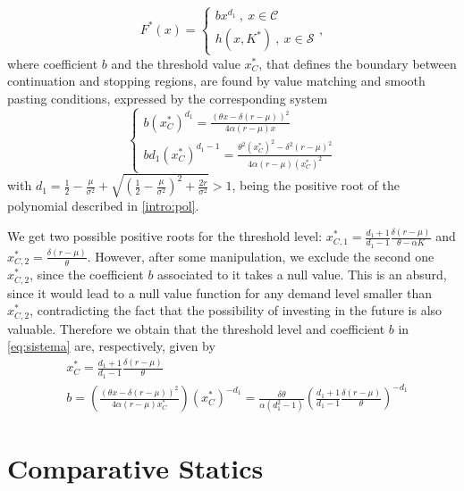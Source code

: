$$F^*(x)=\begin{cases} b x^{d_1}  \ , \ x \in \mathcal{C} \\
h(x,K^*) \ , \ x \in \mathcal{S}
\end{cases},$$
where coefficient $b$ and the threshold value $x_C^*$, that defines the boundary between continuation and stopping regions, are found by value matching and smooth pasting conditions, expressed by the corresponding system
\begin{equation}
\begin{cases} b (x_C^*)^{d_1}=\frac{(\theta x -\delta (r-\mu))^2}{4 \alpha (r-\mu) x} \\
b d_1(x_C^*)^{d_1-1}=\frac{\theta^2 (x_C^*)^2 -\delta^2 (r-\mu)^2}{4 \alpha (r-\mu) (x_C^*)^2}
\end{cases}
\label{eq:sistema3}
\end{equation}
with $d_1=\frac{1}{2}-\frac{\mu}{\sigma^2} +\sqrt{\left( \frac{1}{2} -\frac{\mu}{\sigma^2} \right) ^2+ \frac{2r}{\sigma^2}}>1$, being the positive root of the polynomial described in \eqref{intro:pol}.

We get two possible positive roots for the threshold level: $x^*_{C,1}=\frac{d_1+1}{d_1-1} \frac{ \delta (r-\mu)}{\theta-\alpha K}$ and $x^*_{C,2}=\frac{\delta  (r-\mu )}{\theta }$. However, after some manipulation, we exclude the second one $x^*_{C,2}$, since the coefficient $b$ associated to it takes a null value. This is an absurd, since it would lead to a null value function for any demand level smaller than $x^*_{C,2}$, contradicting the fact that the possibility of investing in the future is also valuable. Therefore we obtain that the threshold level and coefficient $b$ in \eqref{eq:sistema} are, respectively, given by
\begin{align}
 &x_C^*=\frac{d_1+1}{d_1-1} \frac{ \delta (r-\mu)}{\theta} \\
 &b=\left( \frac{(\theta x -\delta (r-\mu))^2}{4 \alpha (r-\mu) x_C^*} \right)(x_C^*)^{-d_1} = \frac{\delta \theta}{\alpha (d_1^2-1)} \left( \frac{d_1+1}{d_1-1} \frac{ \delta (r-\mu)}{\theta} \right)^{-d_1} \nonumber
 \label{prob1_xC}
\end{align}







\section{Comparative Statics}

